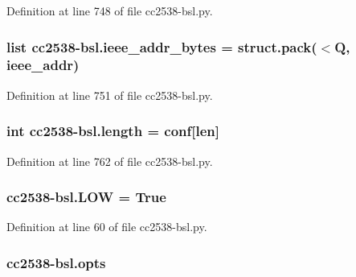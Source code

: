 Definition at line 748 of file cc2538-\/bsl.\+py.

\subsubsection[{\texorpdfstring{ieee\+\_\+addr\+\_\+bytes}{ieee_addr_bytes}}]{\setlength{\rightskip}{0pt plus 5cm}list cc2538-\/bsl.\+ieee\+\_\+addr\+\_\+bytes = struct.\+pack(\textquotesingle{}$<$Q\textquotesingle{}, {\bf ieee\+\_\+addr})}\hypertarget{namespacecc2538-bsl_a9a0abbd5726392bcc9c042a78435094e}{}\label{namespacecc2538-bsl_a9a0abbd5726392bcc9c042a78435094e}


Definition at line 751 of file cc2538-\/bsl.\+py.

\subsubsection[{\texorpdfstring{length}{length}}]{\setlength{\rightskip}{0pt plus 5cm}int cc2538-\/bsl.\+length = {\bf conf}\mbox{[}\textquotesingle{}len\textquotesingle{}\mbox{]}}\hypertarget{namespacecc2538-bsl_a805cc7085603640390bef3787085a8aa}{}\label{namespacecc2538-bsl_a805cc7085603640390bef3787085a8aa}


Definition at line 762 of file cc2538-\/bsl.\+py.

\subsubsection[{\texorpdfstring{L\+OW}{LOW}}]{ cc2538-\/bsl.\+L\+OW = True}\hypertarget{namespacecc2538-bsl_a4422a4b08ec663102510038fb6ca33cf}{}\label{namespacecc2538-bsl_a4422a4b08ec663102510038fb6ca33cf}


Definition at line 60 of file cc2538-\/bsl.\+py.

\subsubsection[{\texorpdfstring{opts}{opts}}]{\setlength{\rightskip}{0pt plus 5cm}cc2538-\/bsl.\+opts}\hypertarget{namespacecc2538-bsl_a97724a250c20159cd28af468f4bcf87c}{}\label{namespacecc2538-bsl_a97724a250c20159cd28af468f4bcf87c}


